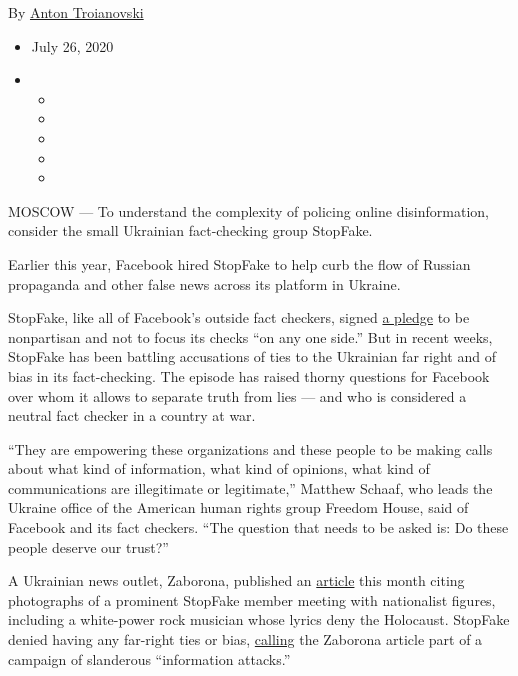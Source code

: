 By \href{https://www.nytimes3xbfgragh.onion/by/anton-troianovski}{Anton
Troianovski}

\begin{itemize}
\item
  July 26, 2020
\item
  \begin{itemize}
  \item
  \item
  \item
  \item
  \item
  \end{itemize}
\end{itemize}

MOSCOW --- To understand the complexity of policing online
disinformation, consider the small Ukrainian fact-checking group
StopFake.

Earlier this year, Facebook hired StopFake to help curb the flow of
Russian propaganda and other false news across its platform in Ukraine.

StopFake, like all of Facebook's outside fact checkers, signed
\href{https://ifcncodeofprinciples.poynter.org/know-more/the-commitments-of-the-code-of-principles}{a
pledge} to be nonpartisan and not to focus its checks ``on any one
side.'' But in recent weeks, StopFake has been battling accusations of
ties to the Ukrainian far right and of bias in its fact-checking. The
episode has raised thorny questions for Facebook over whom it allows to
separate truth from lies --- and who is considered a neutral fact
checker in a country at war.

``They are empowering these organizations and these people to be making
calls about what kind of information, what kind of opinions, what kind
of communications are illegitimate or legitimate,'' Matthew Schaaf, who
leads the Ukraine office of the American human rights group Freedom
House, said of Facebook and its fact checkers. ``The question that needs
to be asked is: Do these people deserve our trust?''

A Ukrainian news outlet, Zaborona, published an
\href{http://zaborona.com/ru/stopfake-i-faktcheking-v-facebook/}{article}
this month citing photographs of a prominent StopFake member meeting
with nationalist figures, including a white-power rock musician whose
lyrics deny the Holocaust. StopFake denied having any far-right ties or
bias,
\href{https://www.stopfake.org/en/the-stopfake-supervisory-board-position-about-the-escalating-information-attacks-directed-against-the-project-team/}{calling}
the Zaborona article part of a campaign of slanderous ``information
attacks.''

